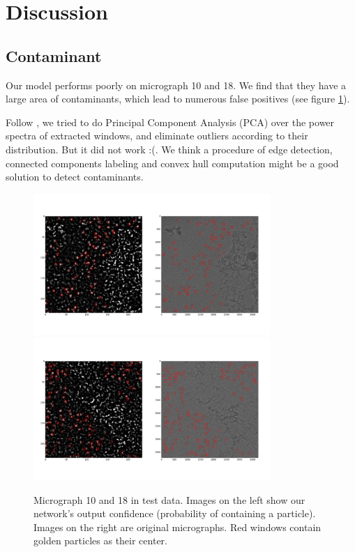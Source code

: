 \documentclass[11pt]{article}
\begin{document}
\section{Discussion}

\subsection{Contaminant}
Our model performs poorly on micrograph 10 and 18. We find that they have a large area of contaminants, which lead to numerous false positives (see figure \ref{contaminant}).

Follow \cite{langlois2014automated}, we tried to do Principal Component Analysis (PCA) over the power spectra of extracted windows, and eliminate outliers according to their distribution. But it did not work :(. We think a procedure of edge detection, connected components labeling and convex hull computation \cite{zhu2004contaminant} might be a good solution to detect contaminants.

\begin{figure}[htbp]
\centering
    \includegraphics[width=0.8\textwidth]{figure_test9.png}
    \includegraphics[width=0.8\textwidth]{figure_test17.png}
\caption{Micrograph 10 and 18 in test data. Images on the left show our network's output confidence (probability of containing a particle). Images on the right are original micrographs. Red windows contain golden particles as their center.}\label{contaminant}
\end{figure}
\end{document}
